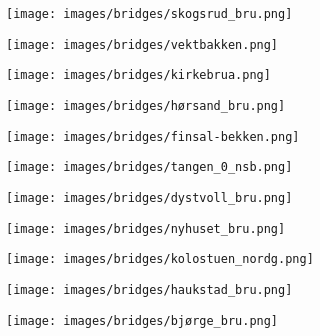 \begin{figure}[H]
    \centering
    \texttt{[image: images/bridges/skogsrud\_bru.png]}
\end{figure}
            
\begin{figure}[H]
    \centering
    \texttt{[image: images/bridges/vektbakken.png]}
\end{figure}
            
\begin{figure}[H]
    \centering
    \texttt{[image: images/bridges/kirkebrua.png]}
\end{figure}
            
\begin{figure}[H]
    \centering
    \texttt{[image: images/bridges/hørsand\_bru.png]}
\end{figure}
            
\begin{figure}[H]
    \centering
    \texttt{[image: images/bridges/finsal-bekken.png]}
\end{figure}
            
\begin{figure}[H]
    \centering
    \texttt{[image: images/bridges/tangen\_0\_nsb.png]}
\end{figure}
            
\begin{figure}[H]
    \centering
    \texttt{[image: images/bridges/dystvoll\_bru.png]}
\end{figure}
            
\begin{figure}[H]
    \centering
    \texttt{[image: images/bridges/nyhuset\_bru.png]}
\end{figure}
            
\begin{figure}[H]
    \centering
    \texttt{[image: images/bridges/kolostuen\_nordg.png]}
\end{figure}
            
\begin{figure}[H]
    \centering
    \texttt{[image: images/bridges/haukstad\_bru.png]}
\end{figure}
            
\begin{figure}[H]
    \centering
    \texttt{[image: images/bridges/bjørge\_bru.png]}
\end{figure}
            
